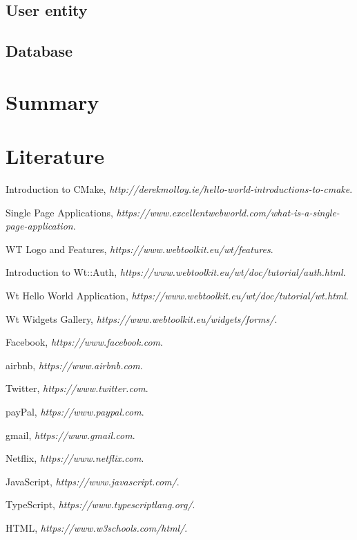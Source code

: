\documentclass[a4paper,12pt]{book}
\begin{document}
\section{User entity}
\section{Database}
\chapter{Summary}
\chapter{Literature}
{
\begin{thebibliography}{9}
  Introduction to CMake,
  \emph{http://derekmolloy.ie/hello-world-introductions-to-cmake}.
  
  Single Page Applications,
  \emph{https://www.excellentwebworld.com/what-is-a-single-page-application}.
  
  WT Logo and Features,
  \emph{https://www.webtoolkit.eu/wt/features}.

  Introduction to Wt::Auth,
  \emph{https://www.webtoolkit.eu/wt/doc/tutorial/auth.html}.
  
  Wt Hello World Application,
  \emph{https://www.webtoolkit.eu/wt/doc/tutorial/wt.html}.

  Wt Widgets Gallery,
  \emph{https://www.webtoolkit.eu/widgets/forms/}.
  
  Facebook,
  \emph{https://www.facebook.com}.
  
  airbnb,
  \emph{https://www.airbnb.com}.
  
  Twitter,
  \emph{https://www.twitter.com}.
  
  payPal,
  \emph{https://www.paypal.com}.
  
  gmail,
  \emph{https://www.gmail.com}.
  
  Netflix,
  \emph{https://www.netflix.com}.

  JavaScript,
  \emph{https://www.javascript.com/}.
  
  TypeScript,
  \emph{https://www.typescriptlang.org/}.
  
  HTML,
  \emph{https://www.w3schools.com/html/}.
  

\end{thebibliography}}
\end{document}
